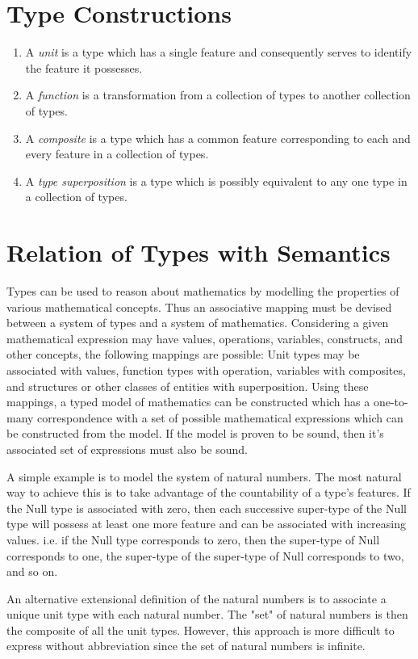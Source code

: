 \documentclass{article}
\begin{document}
\section*{Type Constructions}
\begin{enumerate}
    \item A \textit{unit} is a type which has a single feature and consequently serves to identify the feature it possesses.
    \item A \textit{function} is a transformation from a collection of types to another collection of types.
    \item A \textit{composite} is a type which has a common feature corresponding to each and every feature in a collection of types.
    \item A \textit{type superposition} is a type which is possibly equivalent to any one type in a collection of types.
\end{enumerate}


\section*{Relation of Types with Semantics}
Types can be used to reason about mathematics by modelling the properties of various mathematical concepts.
Thus an associative mapping must be devised between a system of types and a system of mathematics.
Considering a given mathematical expression may have values, operations, variables, constructs, and other concepts, the following mappings are possible:
Unit types may be associated with values, function types with operation, variables with composites, and structures or other classes of entities with superposition.
Using these mappings, a typed model of mathematics can be constructed which has a one-to-many correspondence with a set of possible mathematical expressions which can be constructed from the model.
If the model is proven to be sound, then it's associated set of expressions must also be sound.

A simple example is to model the system of natural numbers.
The most natural way to achieve this is to take advantage of the countability of a type's features.
If the Null type is associated with zero, then each successive super-type of the Null type will possess at least one more feature and can be associated with increasing values.
i.e. if the Null type corresponds to zero, then the super-type of Null corresponds to one, the super-type of the super-type of Null corresponds to two, and so on.

An alternative extensional definition of the natural numbers is to associate a unique unit type with each natural number. The "set" of natural numbers is then the composite of all the unit types. However, this approach is more difficult to express without abbreviation since the set of natural numbers is infinite.
\end{document}
